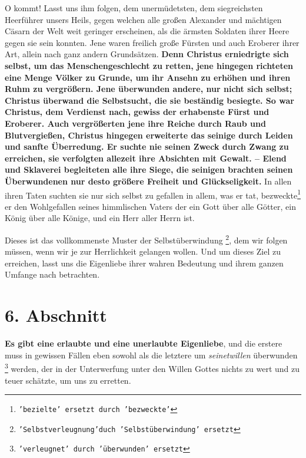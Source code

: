O kommt! Lasst uns ihm folgen, dem unermüdetsten, dem siegreichsten Heerführer
unsers Heils, gegen welchen alle großen Alexander 
und mächtigen Cäsarn der Welt 
weit geringer erscheinen, als die ärmsten Soldaten ihrer Heere
 gegen sie sein
konnten. Jene waren freilich große Fürsten und auch Eroberer
 ihrer Art, allein
nach ganz andern Grundsätzen. \textbf{Denn Christus erniedrigte sich selbst, um
das
Menschengeschlecht zu retten, jene hingegen richteten eine Menge Völker zu
Grunde, um ihr Ansehn zu erhöhen und ihren Ruhm zu vergrößern. Jene überwunden
andere, nur nicht sich selbst; Christus überwand die Selbstsucht, die sie
beständig besiegte. So war Christus, dem Verdienst nach, gewiss der erhabenste
Fürst und Eroberer. Auch vergrößerten jene ihre Reiche durch Raub und
Blutvergießen, Christus hingegen erweiterte das seinige durch Leiden und sanfte
Überredung. Er suchte nie seinen Zweck durch Zwang zu erreichen, sie verfolgten
allezeit ihre Absichten mit Gewalt. -- Elend und Sklaverei begleiteten alle ihre
Siege, die seinigen brachten seinen Überwundenen nur desto größere Freiheit und
Glückseligkeit.} In allen ihren Taten suchten sie nur sich selbst zu gefallen
in allem, was er tat, bezweckte\footnote{\texttt{'bezielte' ersetzt durch 'bezweckte'}} 
er den Wohlgefallen seines himmlischen Vaters
der ein Gott über alle Götter, ein König über alle Könige, und ein Herr aller
Herrn ist.

Dieses ist das vollkommenste Muster der Selbstüberwindung
\footnote{\texttt{'Selbstverleugnung'duch 'Selbstüberwindung' ersetzt}}, dem wir
folgen
müssen, wenn wir je zur Herrlichkeit gelangen wollen. Und um dieses Ziel zu
erreichen, lasst uns die Eigenliebe ihrer wahren Bedeutung und ihrem ganzen
Umfange nach betrachten.

\section{6. Abschnitt} \label{kap4_ab6}

\textbf{Es gibt eine erlaubte und eine unerlaubte Eigenliebe}, und die erstere
muss in
gewissen Fällen eben sowohl als die letztere um \textit{seinetwillen} überwunden
\footnote{\texttt{'verleugnet' durch 'überwunden' ersetzt}}
werden, der in der Unterwerfung unter den Willen Gottes nichts zu wert und zu
teuer schätzte, um uns zu erretten.

